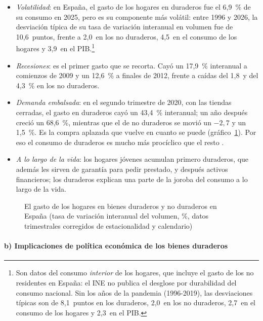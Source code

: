\documentclass[11pt]{article}
\begin{document}
\begin{itemize}
\item \emph{Volatilidad}: en España, el gasto de los hogares en duraderos fue el 6,9~\% de su consumo en 2025, pero es su componente más volátil: entre 1996 y 2026, la desviación típica de su tasa de variación interanual en volumen fue de 10,6~puntos, frente a 2,0~en los no duraderos, 4,5~en el consumo de los hogares y 3,9~en el PIB\nocite{INE2026CNTRDemanda}.\footnote{Son datos del consumo \emph{interior} de los hogares, que incluye el gasto de los no residentes en España: el INE no publica el desglose por durabilidad del consumo nacional. Sin los años de la pandemia (1996-2019), las desviaciones típicas son de 8,1~puntos en los duraderos, 2,0~en los no duraderos, 2,7~en el consumo de los hogares y 2,3~en el PIB.}
\item \emph{Recesiones}: es el primer gasto que se recorta. Cayó un 17,9~\% interanual a comienzos de 2009 y un 12,6~\% a finales de 2012, frente a caídas del 1,8~y del 4,3~\% en los no duraderos\nocite{INE2026CNTRDemanda}.
\item \emph{Demanda embalsada}: en el segundo trimestre de 2020, con las tiendas cerradas, el gasto en duraderos cayó un 43,4~\% interanual; un año después creció un 68,6~\%, mientras que el de no duraderos se movió un $-2{,}7$ y un 1,5~\%\nocite{INE2026CNTRDemanda,Eurostat2026namq10fcs}. Es la compra aplazada que vuelve en cuanto se puede (gráfico~\ref{fig:duraderos-datos}). Por eso el consumo de duraderos es mucho más procíclico que el resto .
\item \emph{A lo largo de la vida}: los hogares jóvenes acumulan primero duraderos, que además les sirven de garantía para pedir prestado, y después activos financieros; los duraderos explican una parte de la joroba del consumo a lo largo de la vida\nocite{FernandezVillaverdeKrueger2011Consumption}.
\end{itemize}

\begin{figure}[H]
\centering
\caption{El gasto de los hogares en bienes duraderos y no duraderos en España (tasa de variación interanual del volumen, \%, datos trimestrales corregidos de estacionalidad y calendario)}\label{fig:duraderos-datos}
\end{figure}

\paragraph{b) Implicaciones de política económica de los bienes duraderos}
\end{document}
